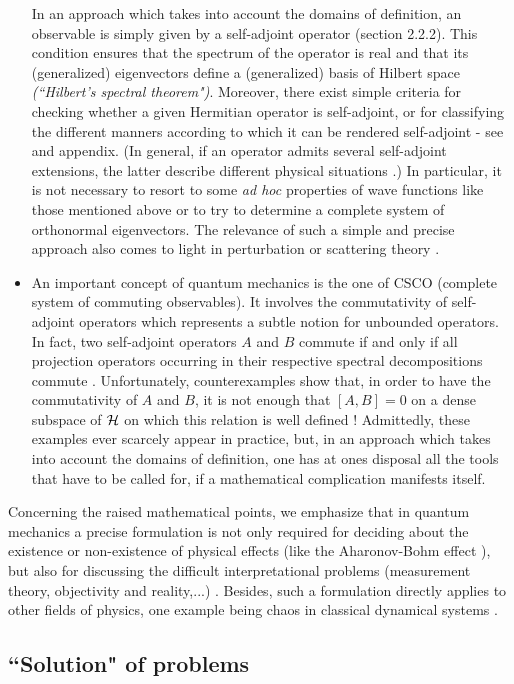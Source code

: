 \documentclass[a4wide,12pt]{report}
\begin{document}
\begin{itemize}
In an approach which takes into account the domains of definition, 
an observable is simply given by a self-adjoint operator 
(section 2.2.2). This condition ensures that 
the spectrum of the operator is real and that its (generalized)
eigenvectors define a (generalized) basis of Hilbert space
{\em (``Hilbert's spectral theorem")}.
Moreover, there exist simple criteria for checking
whether a given Hermitian 
operator is self-adjoint, or for classifying 
the different manners according to 
which it can be rendered self-adjoint
- see \cite{rs,sg,th} and appendix. (In general, 
if an operator admits several self-adjoint extensions, 
the latter describe different physical situations
\cite{aw,rs}.) In particular, it is not necessary 
to resort to some {\em ad hoc} properties of wave functions like those 
mentioned above or to try to determine a complete system of 
orthonormal eigenvectors. 
The relevance of such a simple and precise approach 
also comes to light in perturbation \cite{th,klau}
or scattering theory \cite{amj}. 
\item
An important concept of quantum mechanics is the one of CSCO
(complete system of commuting observables). 
It involves the commutativity of self-adjoint operators 
which represents a subtle notion for unbounded operators. 
In fact, two self-adjoint operators $A$ and $B$ commute if and only if 
all projection operators occurring in their respective 
spectral decompositions commute \cite{rs}.
Unfortunately, counterexamples show that, in order to have  
the commutativity of $A$ and $B$, 
it is not enough that $[A,B] =0$ on a
dense  subspace of ${\cal H}$ on which this relation 
is well defined \cite{rs}!
Admittedly, these examples ever scarcely  appear in practice, 
but, in an approach which takes into account the domains
of definition, one has at ones disposal all the tools 
that have to be called for, if a mathematical complication 
manifests itself. 
\end{itemize}
Concerning the raised mathematical points, we emphasize that 
in quantum mechanics a precise formulation is not  
only required for deciding about the existence or non-existence
of physical effects (like the Aharonov-Bohm effect \cite{ab}),
but also for discussing the difficult interpretational problems
(measurement theory, objectivity and reality,...) \cite{au}. 
Besides, such a formulation 
directly applies to other fields of physics, one example being 
chaos in classical dynamical systems \cite{pri}.
 
\subsection{``Solution" of problems}
\end{document}
